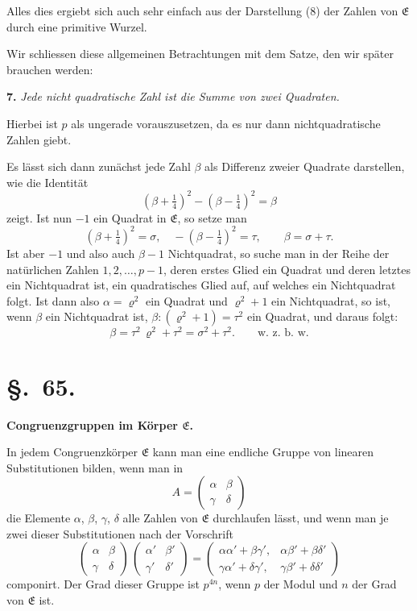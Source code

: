 \documentclass[12pt,a4paper]{article}
\newcommand{\sect}[1]{\section*{{\S.~#1.}}\addcontentsline{toc}{section}{\S.~#1}}
\begin{document}
Alles dies ergiebt sich auch sehr einfach aus der Darstellung (8) der Zahlen von $\mathfrak{E}$ durch eine primitive Wurzel.

Wir schliessen diese allgemeinen Betrachtungen mit dem Satze, den wir später brauchen werden:

\medskip\noindent
\textbf{7.} \emph{Jede nicht quadratische Zahl ist die Summe von zwei Quadraten.}

Hierbei ist $p$ als ungerade vorauszusetzen, da es nur dann nichtquadratische Zahlen giebt.

Es lässt sich dann zunächst jede Zahl $\beta$ als Differenz zweier Quadrate darstellen, wie die Identität
\[
(\beta + \tfrac{1}{4})^{2} - (\beta - \tfrac{1}{4})^{2} = \beta
\]
zeigt. Ist nun $-1$ ein Quadrat in $\mathfrak{E}$, so setze man
\[
(\beta + \tfrac{1}{4})^{2} = \sigma,\quad -(\beta - \tfrac{1}{4})^{2} = \tau,\qquad
\beta = \sigma + \tau.
\]
Ist aber $-1$ und also auch $\beta - 1$ Nichtquadrat, so suche man in der Reihe der natürlichen Zahlen $1, 2, \ldots, p-1$, deren erstes Glied ein Quadrat und deren letztes ein Nichtquadrat ist, ein quadratisches Glied auf, auf welches ein Nichtquadrat folgt. Ist dann also $\alpha = \varrho^{2}$ ein Quadrat und $\varrho^{2} + 1$ ein Nichtquadrat, so ist, wenn $\beta$ ein Nichtquadrat ist, $\beta : (\varrho^{2} + 1) = \tau^{2}$ ein Quadrat, und daraus folgt:
\[
\beta = \tau^{2}\,\varrho^{2} + \tau^{2} = \sigma^{2} + \tau^{2}.\qquad\text{w.~z.~b.~w.}
\]



\newpage
\sect{65}
\begin{center}
\textbf{Congruenzgruppen im Körper $\mathfrak{E}$.}
\end{center}
\label{sec:65}

In jedem Congruenzkörper $\mathfrak{E}$ kann man eine endliche Gruppe von linearen Substitutionen bilden, wenn man in
\begin{equation}\label{eq:65.1}
\tag{1}
A = \begin{pmatrix}\alpha&\beta\\\gamma&\delta\end{pmatrix}
\end{equation}
die Elemente $\alpha$, $\beta$, $\gamma$, $\delta$ alle Zahlen von $\mathfrak{E}$ durchlaufen lässt, und wenn man je zwei dieser Substitutionen nach der Vorschrift
\begin{equation}\label{eq:65.2}
\tag{2}
\begin{pmatrix}\alpha&\beta\\\gamma&\delta\end{pmatrix}\,
\begin{pmatrix}\alpha'&\beta'\\\gamma'&\delta'\end{pmatrix}
=
\begin{pmatrix}
\alpha\alpha' + \beta\gamma',& \alpha\beta' + \beta\delta'\\
\gamma\alpha' + \delta\gamma',& \gamma\beta' + \delta\delta'
\end{pmatrix}
\end{equation}
componirt. Der Grad dieser Gruppe ist $p^{4n}$, wenn $p$ der Modul und $n$ der Grad von $\mathfrak{E}$ ist.
\end{document}
